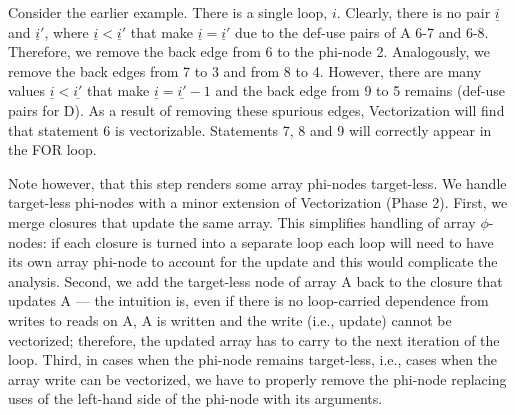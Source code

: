 Consider the earlier example. There is a single loop, $i$. Clearly, there is no pair $\underline{i}$ and $\underline{i}'$, where $\underline{i} < \underline{i}'$ that make $\underline{i} = \underline{i}'$
due to the def-use pairs of {\sf A} 6-7 and 6-8.
Therefore, we remove the back edge from 6 to the phi-node 2. Analogously, we remove the back edges from 7 to 3 and from 8 to 4. However, there are many values $\underline{i} < \underline{i'}$ that make $\underline{i} = \underline{i'}-1$ and the back edge from 9 to 5 remains (def-use pairs for {\sf D}). As a result of removing these spurious edges, Vectorization will find that statement 6 is vectorizable. Statements 7, 8 and 9 will correctly appear in the FOR loop.

Note however, that this step renders some array phi-nodes target-less. We handle target-less phi-nodes with a minor extension of Vectorization (Phase 2).
First, we merge closures that update the same array. This simplifies handling of array $\phi$-nodes: if each closure is turned into a separate loop
each loop will need to have its own array phi-node to account for the update and this would complicate the analysis.
Second, we add the target-less node of array {\sf A} back to the closure that updates {\sf A} ---
the intuition is, even if there is no loop-carried dependence from writes to reads on {\sf A}, {\sf A} is written and the write (i.e., update) cannot be vectorized;
therefore, the updated array has to carry to the next iteration of the loop. Third, in cases when the phi-node remains target-less, i.e., cases when the
array write can be vectorized, we have to properly remove the phi-node replacing uses of the left-hand side of the phi-node with its arguments.



